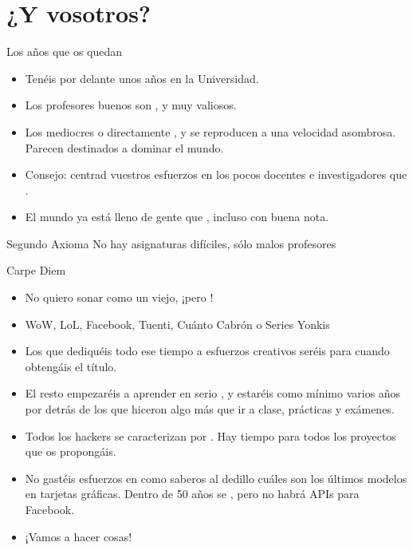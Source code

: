 \documentclass[14pt]{beamer}
\begin{document}
\section{¿Y vosotros?}
\begin{frame}{Los años que os quedan}
  \begin{itemize}
    \item Tenéis por delante unos años  en la
      Universidad.
    \item Los profesores buenos son , y muy valiosos.
    \item Los mediocres o directamente , y
      se reproducen a una velocidad asombrosa. Parecen destinados a
      dominar el mundo.
    \item Consejo: centrad vuestros esfuerzos en los pocos docentes e
      investigadores que .
    \item El mundo ya está lleno de gente que , incluso con buena nota.
  \end{itemize}

  \begin{alertblock}{\centering Segundo Axioma}
    \centering No hay asignaturas difíciles, sólo malos profesores
  \end{alertblock}
\end{frame}

\begin{frame}{Carpe Diem}
  \begin{itemize}
    \item No quiero sonar como un viejo, ¡pero !
    \item WoW, LoL, Facebook, Tuenti, Cuánto Cabrón o Series Yonkis
    \item Los que dediquéis todo ese tiempo a esfuerzos creativos
      seréis  para
      cuando obtengáis el título.
    \item El resto empezaréis a aprender en serio , y estaréis como mínimo varios años por detrás de los
      que hiceron algo más que ir a clase, prácticas y exámenes.
    \item Todos los hackers se caracterizan por . Hay tiempo para todos los proyectos que os
      propongáis.
    \item No gastéis esfuerzos en 
      como saberos al dedillo cuáles son los últimos modelos en
      tarjetas gráficas. Dentro de 50 años se , pero no habrá APIs para Facebook.
    \item ¡Vamos a hacer cosas!
  \end{itemize}
\end{frame}
\end{document}
